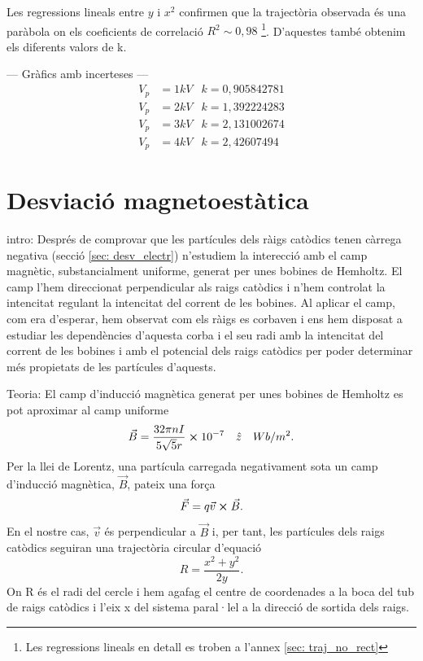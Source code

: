 \documentclass[11pt]{article}
\begin{document}
 Les regressions lineals entre $y$ i $x^2$ confirmen que la trajectòria observada és una paràbola on els coeficients de correlació $R^2 \sim 0,98$ \footnote{Les regressions lineals en detall es troben a l'annex \ref{sec: traj_no_rect}}. D'aquestes també obtenim els diferents valors de k.

--- Gràfics amb incerteses ---
\begin{align*}
    V_p &= 1kV      & k = 0,905842781 \\
    V_p &= 2kV      & k = 1,392224283 \\
    V_p &= 3kV      & k = 2,131002674 \\
    V_p &= 4kV      & k = 2,42607494 
\end{align*}




\section{Desviació magnetoestàtica}\label{sec: desv_magn}
intro: Després de comprovar que les partícules dels ràigs catòdics tenen càrrega negativa (secció \ref{sec: desv_electr}) n'estudiem la interecció amb el camp magnètic, substancialment uniforme, generat per unes bobines de Hemholtz. 
El camp l'hem direccionat perpendicular als raigs catòdics i n'hem controlat la intencitat regulant la intencitat del corrent de les bobines. Al aplicar el camp, com era d'esperar, hem observat com els ràigs es corbaven i ens hem disposat a estudiar les dependències d'aquesta corba i el seu radi amb la intencitat del corrent de les bobines i amb el potencial dels raigs catòdics per poder determinar més propietats de les partícules d'aquests. 

Teoria: 
El camp d'inducció magnètica generat per unes bobines de Hemholtz es pot aproximar al camp uniforme 
\begin{equation}
    \vec{B}=\frac{32\pi nI}{5\sqrt{5}r}\cross10^{-7} \quad \hat{z}\quad Wb/m^2.
    \label{eq: B}
\end{equation}
Per la llei de Lorentz, una partícula carregada negativament sota un camp d'inducció magnètica, $\vec{B}$, pateix una força
\begin{equation}
    \vec{F}=q\vec{v}\cross\vec{B}.
    \label{eq: Lorentz} 
\end{equation} 
En el nostre cas, $\vec{v}$ és perpendicular a $\vec{B }$ i, per tant, les partícules dels raigs catòdics seguiran una trajectòria circular d'equació
\begin{equation}
    R=\frac{x^2+y^2}{2y}.
    \label{eq: radi}
\end{equation}
On R és el radi del cercle i hem agafag el centre de coordenades a la boca del tub de raigs catòdics i l'eix x del sistema paral·lel a la direcció de sortida dels raigs.
\end{document}
